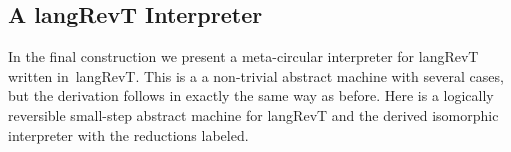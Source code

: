 \documentclass{llncs}
\begin{document}
\subsection{A {{langRevT}} Interpreter}
\label{sec:langrevt-int}

In the final construction we present a meta-circular interpreter for
{{langRevT}} written in~{{langRevT}}. This is a a non-trivial abstract
machine with several cases, but the derivation follows in exactly the same
way as before. Here is a logically reversible small-step abstract machine for
{{langRevT}} and the derived isomorphic interpreter with the reductions
labeled.

\begin{scriptsize}
  


%

\vspace{-15pt}

\end{scriptsize}
\end{document}
